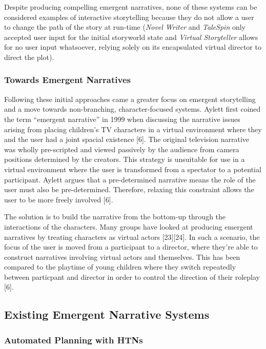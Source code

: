 \documentclass{sig-alternate-05-2015}
\begin{document}
Despite producing compelling emergent narratives, none of these systems can be considered examples of interactive storytelling because they do not allow a user to change the path of the story at run-time (\textit{Novel Writer} and \textit{TaleSpin} only accepted user input for the initial storyworld state and \textit{Virtual Storyteller} allows for no user input whatsoever, relying solely on its encapsulated virtual director to direct the plot).\\

\subsubsection{Towards Emergent Narratives}

\noindent Following these initial approaches came a greater focus on emergent storytelling and a move towards non-branching, character-focused systems. Aylett first coined the term ``emergent narrative'' in 1999 when discussing the narrative issues arising from placing children's TV characters in a virtual environment where they and the user had a joint spacial existence [6]. The original television narrative was wholly pre-scripted and viewed passively by the audience from camera positions determined by the creators. This strategy is unsuitable for use in a virtual environment where the user is transformed from a spectator to a potential participant. Aylett argues that a pre-determined narrative means the role of the user must also be pre-determined. Therefore, relaxing this constraint allows the user to be more freely involved [6].

The solution is to build the narrative from the bottom-up through the interactions of the characters. Many groups have looked at producing emergent narratives by treating characters as virtual actors [23][24]. In such a scenario, the focus of the user is moved from a participant to a director, where they're able to construct narratives involving virtual actors and themselves. This has been compared to the playtime of young children where they switch repeatedly between particpant and director in order to control the direction of their roleplay [6].

\subsection{Existing Emergent Narrative Systems}

\subsubsection{Automated Planning with HTNs}
\end{document}
